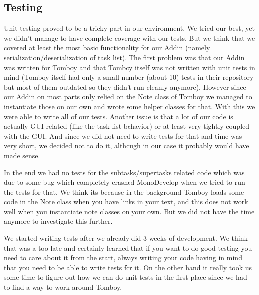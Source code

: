 \subsection{Testing}
\label{testing}
Unit testing proved to be a tricky part in our environment. We tried our best, yet we didn't manage to have complete coverage with our tests. But we think that we covered at least the most basic functionality for our Addin (namely serialization/deserialization of task list).
The first problem was that our Addin was written for Tomboy and that Tomboy itself was not written with unit tests in mind (Tomboy itself had only a small number (about 10) tests in their repository but most of them outdated so they didn't run cleanly anymore). However since our Addin on most parts only relied on the Note class of Tomboy we managed to instantiate those on our own and wrote some helper classes for that. With this we were able to write all of our tests.
Another issue is that a lot of our code is actually GUI related (like the task list behavior) or at least very tightly coupled with the GUI. And since we did not need to write tests for that and time was very short, we decided not to do it, although in our case it probably would have made sense.

In the end we had no tests for the subtasks/supertasks related code which was due to some bug which completely crashed MonoDevelop when we tried to run the tests for that. We think its because in the background Tomboy loads some code in the Note class when you have links in your text, and this does not work well when you instantiate note classes on your own. But we did not have the time anymore to investigate this further.

We started writing tests after we already did 3 weeks of development. We think that was a too late and certainly learned that if you want to do good testing you need to care about it from the start, always writing your code having in mind that you need to be able to write tests for it. On the other hand it really took us some time to figure out how we can do unit tests in the first place since we had to find a way to work around Tomboy.